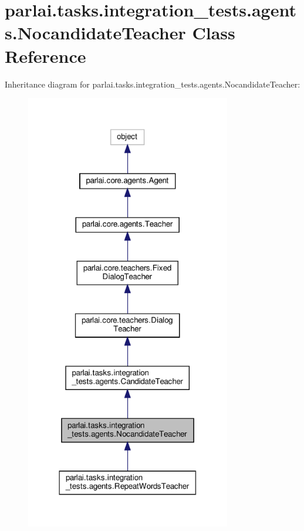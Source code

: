 \hypertarget{classparlai_1_1tasks_1_1integration__tests_1_1agents_1_1NocandidateTeacher}{}\section{parlai.\+tasks.\+integration\+\_\+tests.\+agents.\+Nocandidate\+Teacher Class Reference}
\label{classparlai_1_1tasks_1_1integration__tests_1_1agents_1_1NocandidateTeacher}


Inheritance diagram for parlai.\+tasks.\+integration\+\_\+tests.\+agents.\+Nocandidate\+Teacher\+:
\nopagebreak
\begin{figure}[H]
\begin{center}
\leavevmode
\includegraphics[width=254pt]{classparlai_1_1tasks_1_1integration__tests_1_1agents_1_1NocandidateTeacher__inherit__graph}
\end{center}
\end{figure}


